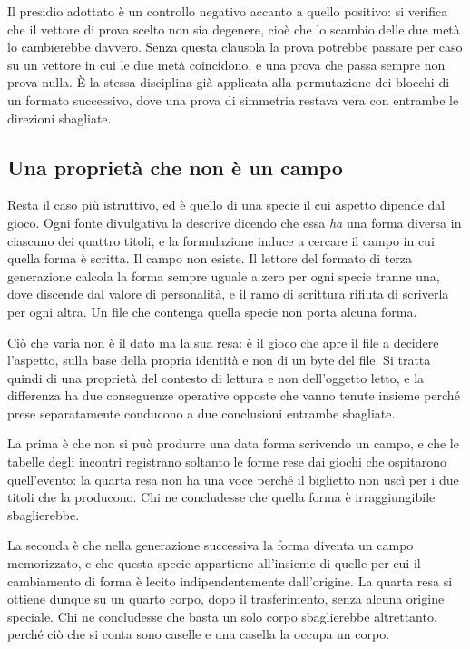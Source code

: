 Il presidio adottato è un controllo negativo accanto a quello positivo: si verifica che il vettore di prova scelto non sia degenere, cioè che lo scambio delle due metà lo cambierebbe davvero. Senza questa clausola la prova potrebbe passare per caso su un vettore in cui le due metà coincidono, e una prova che passa sempre non prova nulla. È la stessa disciplina già applicata alla permutazione dei blocchi di un formato successivo, dove una prova di simmetria restava vera con entrambe le direzioni sbagliate.

\subsection{Una proprietà che non è un campo}

Resta il caso più istruttivo, ed è quello di una specie il cui aspetto dipende dal gioco. Ogni fonte divulgativa la descrive dicendo che essa \emph{ha} una forma diversa in ciascuno dei quattro titoli, e la formulazione induce a cercare il campo in cui quella forma è scritta. Il campo non esiste. Il lettore del formato di terza generazione calcola la forma sempre uguale a zero per ogni specie tranne una, dove discende dal valore di personalità, e il ramo di scrittura rifiuta di scriverla per ogni altra. Un file che contenga quella specie non porta alcuna forma.

Ciò che varia non è il dato ma la sua resa: è il gioco che apre il file a decidere l'aspetto, sulla base della propria identità e non di un byte del file. Si tratta quindi di una proprietà del contesto di lettura e non dell'oggetto letto, e la differenza ha due conseguenze operative opposte che vanno tenute insieme perché prese separatamente conducono a due conclusioni entrambe sbagliate.

La prima è che non si può produrre una data forma scrivendo un campo, e che le tabelle degli incontri registrano soltanto le forme rese dai giochi che ospitarono quell'evento: la quarta resa non ha una voce perché il biglietto non uscì per i due titoli che la producono. Chi ne concludesse che quella forma è irraggiungibile sbaglierebbe.

La seconda è che nella generazione successiva la forma diventa un campo memorizzato, e che questa specie appartiene all'insieme di quelle per cui il cambiamento di forma è lecito indipendentemente dall'origine. La quarta resa si ottiene dunque su un quarto corpo, dopo il trasferimento, senza alcuna origine speciale. Chi ne concludesse che basta un solo corpo sbaglierebbe altrettanto, perché ciò che si conta sono caselle e una casella la occupa un corpo.

